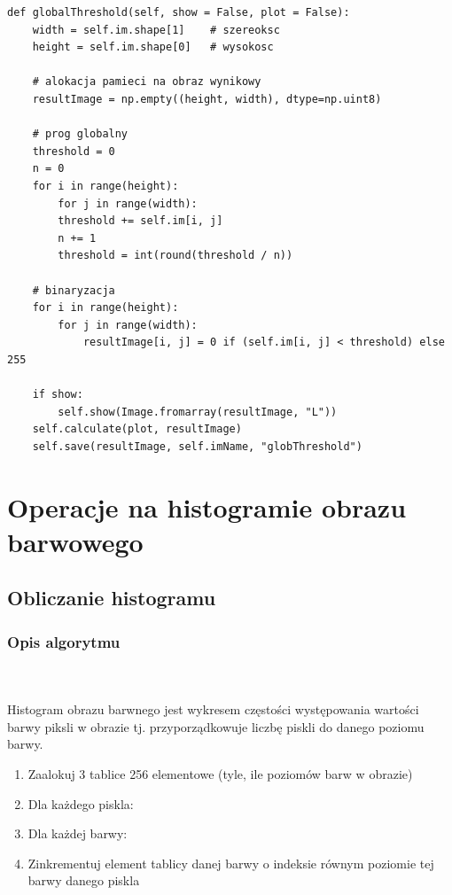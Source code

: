 \documentclass[final,a4paper,openany,12pt]{mwbk}
\begin{document}
\begin{lstlisting}[caption=Progowanie globalne]
def globalThreshold(self, show = False, plot = False):
	width = self.im.shape[1]    # szereoksc
	height = self.im.shape[0]   # wysokosc
	
	# alokacja pamieci na obraz wynikowy
	resultImage = np.empty((height, width), dtype=np.uint8)
	
	# prog globalny
	threshold = 0
	n = 0
	for i in range(height):
		for j in range(width):
		threshold += self.im[i, j]
		n += 1
		threshold = int(round(threshold / n))
	
	# binaryzacja
	for i in range(height):
		for j in range(width):
			resultImage[i, j] = 0 if (self.im[i, j] < threshold) else 255
	
	if show:
		self.show(Image.fromarray(resultImage, "L"))
	self.calculate(plot, resultImage)
	self.save(resultImage, self.imName, "globThreshold")
\end{lstlisting}
\newpage






\chapter{Operacje na histogramie obrazu barwowego}
\pagebreak
\section{Obliczanie histogramu}
\subsection*{Opis algorytmu}
\hfill
\\\\
\indent Histogram obrazu barwnego jest wykresem częstości występowania wartości barwy piksli w obrazie tj.
przyporządkowuje liczbę piskli do danego poziomu barwy.\newline
\begin{enumerate}
	\item Zaalokuj 3 tablice 256 elementowe (tyle, ile poziomów barw w obrazie)
	\item Dla każdego piskla:
	\item Dla każdej barwy:
	\item Zinkrementuj element tablicy danej barwy o indeksie równym poziomie tej barwy danego piskla
\end{enumerate}
\end{document}
